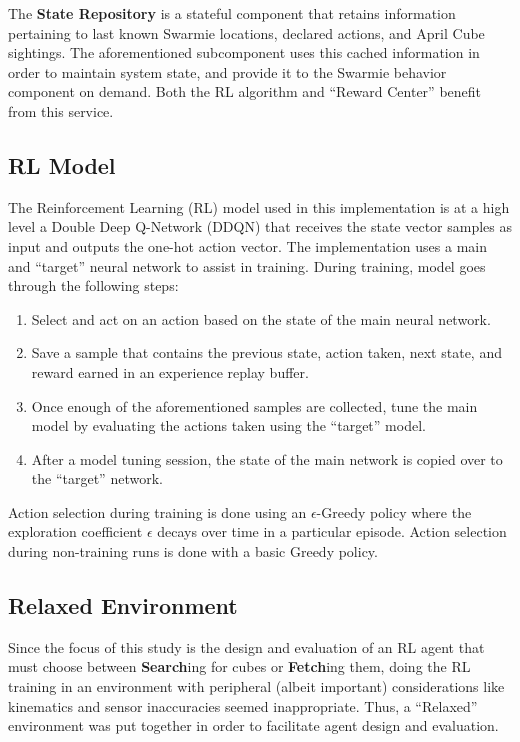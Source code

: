 \documentclass[sigconf,authordraft]{acmart}
\begin{document}
The \textbf{State Repository} is a stateful component that retains information pertaining to last known Swarmie locations, declared actions, and April Cube sightings. The aforementioned subcomponent uses this cached information in order to maintain system state, and provide it to the Swarmie behavior component on demand. Both the RL algorithm and ``Reward Center'' benefit from this service.

\subsection{RL Model}\label{subsec:rl_model}
The Reinforcement Learning (RL) model used in this implementation is at a high level a Double Deep Q-Network (DDQN) that receives the state vector samples as input and outputs the one-hot action vector. The implementation uses a main and ``target'' neural network to assist in training. During training, model goes through the following steps:
\begin{enumerate}
  \item Select and act on an action based on the state of the main neural network.
  \item Save a sample that contains the previous state, action taken, next state, and reward earned in an experience replay buffer.
  \item Once enough of the aforementioned samples are collected, tune the main model by evaluating the actions taken using the ``target'' model.
  \item After a model tuning session, the state of the main network is copied over to the ``target'' network.
\end{enumerate}

Action selection during training is done using an $\epsilon$-Greedy policy where the exploration coefficient $\epsilon$ decays over time in a particular episode. Action selection during non-training runs is done with a basic Greedy policy.

\subsection{Relaxed Environment}\label{subsec:relaxed_env}
Since the focus of this study is the design and evaluation of an RL agent that must choose between \textbf{Search}ing for cubes or \textbf{Fetch}ing them, doing the RL training in an environment with peripheral (albeit important) considerations like kinematics and sensor inaccuracies seemed inappropriate. Thus, a ``Relaxed'' environment was put together in order to facilitate agent design and evaluation.
\end{document}
